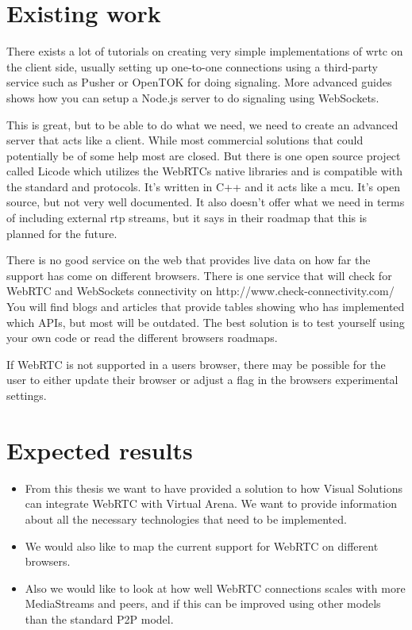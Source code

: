 \section{Existing work}
There exists a lot of tutorials on creating very simple implementations of \gls{wrtc} on the client side, usually setting up one-to-one connections using a third-party service such as Pusher or OpenTOK for doing signaling. More advanced guides shows how you can setup a Node.js server to do signaling using WebSockets.

This is great, but to be able to do what we need, we need to create an advanced server that acts like a client. While most commercial solutions that could potentially be of some help most are closed. But there is one open source project called Licode which utilizes the WebRTCs native libraries and is compatible with the standard and protocols. It's written in C++ and it acts like a \gls{mcu}. It's open source, but not very well documented. It also doesn't offer what we need in terms of including external \gls{rtp} streams, but it says in their roadmap that this is planned for the future.

There is no good service on the web that provides live data on how far the support has come on different browsers. There is one service that will check for WebRTC and WebSockets connectivity on http://www.check-connectivity.com/
You will find blogs and articles that provide tables showing who has implemented which APIs, but most will be outdated. The best solution is to test yourself using your own code or read the different browsers roadmaps.

If WebRTC is not supported in a users browser, there may be possible for the user to either update their browser or adjust a flag in the browsers experimental settings.

\section{Expected results}

\begin{itemize}
    \item From this thesis we want to have provided a solution to how Visual Solutions can integrate WebRTC with Virtual Arena. We want to provide information about all the necessary technologies that need to be implemented.
    \item We would also like to map the current support for WebRTC on different browsers.
    \item Also we would like to look at how well WebRTC connections scales with more MediaStreams and peers, and if this can be improved using other models than the standard P2P model.
\end{itemize}
